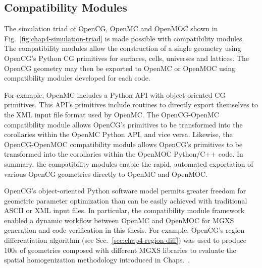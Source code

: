 \subsection{Compatibility Modules}
\label{sec:chap4-opencg-compatibility}

The simulation triad of OpenCG, OpenMC and OpenMOC shown in Fig.~\ref{fig:chap4-simulation-triad} is made possible with compatibility modules. The compatibility modules allow the construction of a single geometry using OpenCG's Python \ac{CG} primitives for surfaces, cells, universes and lattices. The OpenCG geometry may then be exported to OpenMC or OpenMOC using compatibility modules developed for each code.

For example, OpenMC includes a Python \ac{API} with object-oriented \ac{CG} primitives. This \ac{API}'s primitives include routines to directly export themselves to the \ac{XML} input file format used by OpenMC. The OpenCG-OpenMC compatibility module allows OpenCG's primitives to be transformed into the corollaries within the OpenMC Python \ac{API}, and vice versa. Likewise, the OpenCG-OpenMOC compatibility module allows OpenCG's primitives to be transformed into the corollaries within the OpenMOC Python/C++ code. In summary, the compatibility modules enable the rapid, automated exportation of various OpenCG geometries directly to OpenMC and OpenMOC.

OpenCG's object-oriented Python software model permits greater freedom for geometric parameter optimization than can be easily achieved with traditional \ac{ASCII} or \ac{XML} input files. In particular, the compatibility module framework enabled a dynamic workflow between OpenMC and OpenMOC for \ac{MGXS} generation and code verification in this thesis. For example, OpenCG's region differentiation algorithm (see Sec.~\ref{sec:chap4-region-diff}) was used to produce 100s of geometries composed with different \ac{MGXS} libraries to evaluate the spatial homogenization methodology introduced in Chaps.~.



